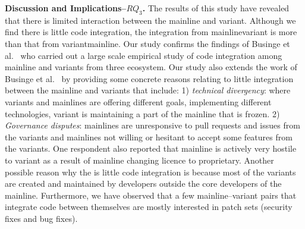 \nd \textbf{Discussion and Implications--$RQ_3$.}
The results of this study have revealed that there is limited interaction between the mainline and variant.
Although we find there is little code integration, the integration from mainline\ra variant is more than that from variant\ra mainline. 
Our study confirms the findings of Businge et al.~\cite{businge:emse:2021} who carried out a large scale empirical study of code integration among mainline and variants from three ecosystem. Our study also extends the work of Businge et al.~\cite{businge:emse:2021} by providing some concrete reasons relating to little integration between the mainline and variants that include: 1) \textit{technical divergency}: where variants and mainlines are offering different goals, implementing different technologies, variant is maintaining a part of the mainline that is frozen. 2) \textit{Governance disputes}: mainlines are unresponsive to pull requests and issues from the variants and  mainlines not willing or hesitant to accept some features from the variants. One respondent also reported that mainline is actively very hostile to variant as a result of mainline changing licence to proprietary.
Another possible reason why the is little code integration is because most of the variants are created and maintained by developers outside the core developers of the mainline.
Furthermore, we have observed that a few mainline--variant pairs that integrate code between themselves are mostly interested in patch sets (security fixes and bug fixes).

